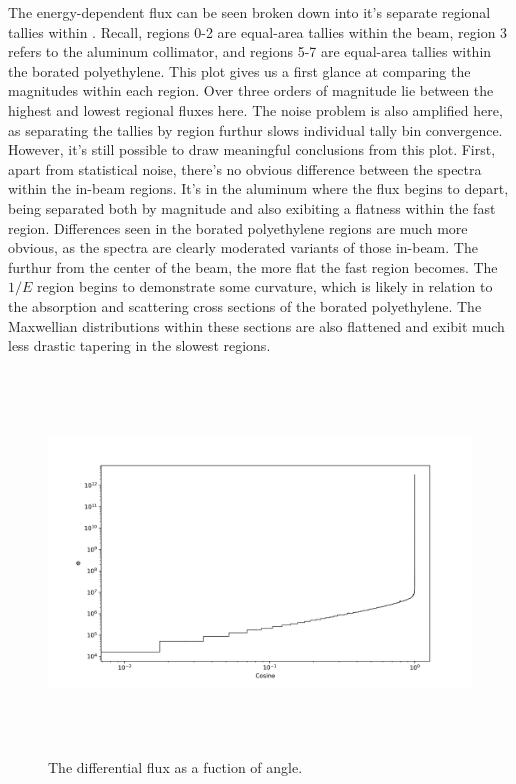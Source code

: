 The energy-dependent flux can be seen broken down into it's separate regional tallies within .
Recall, regions 0-2 are equal-area tallies within the beam, region 3 refers to the aluminum collimator, and regions 5-7 are equal-area tallies within the borated polyethylene.
This plot gives us a first glance at comparing the magnitudes within each region.
Over three orders of magnitude lie between the highest and lowest regional fluxes here.
The noise problem  is also amplified here, as separating the tallies by region furthur slows individual tally bin convergence.
However, it's still possible to draw meaningful conclusions from this plot.
First, apart from statistical noise, there's no obvious difference between the spectra within the in-beam regions.
It's in the aluminum where the flux begins to depart, being separated both by magnitude and also exibiting a flatness within the fast region.
Differences seen in the borated polyethylene regions are much more obvious, as the spectra are clearly moderated variants of those in-beam.
The furthur from the center of the beam, the more flat the fast region becomes.
The $1/E$ region begins to demonstrate some curvature, which is likely in relation to the absorption and scattering cross sections of the borated polyethylene.
The Maxwellian distributions within these sections are also flattened and exibit much less drastic tapering in the slowest regions.


%
\begin{figure}[htb]
\centering
\includegraphics[height=4in]{tex/figures/flux_cos.png}
\caption[Flux vs. Angle]{The differential flux as a fuction of angle.}
\label{fig:flux_cos}
\end{figure}

